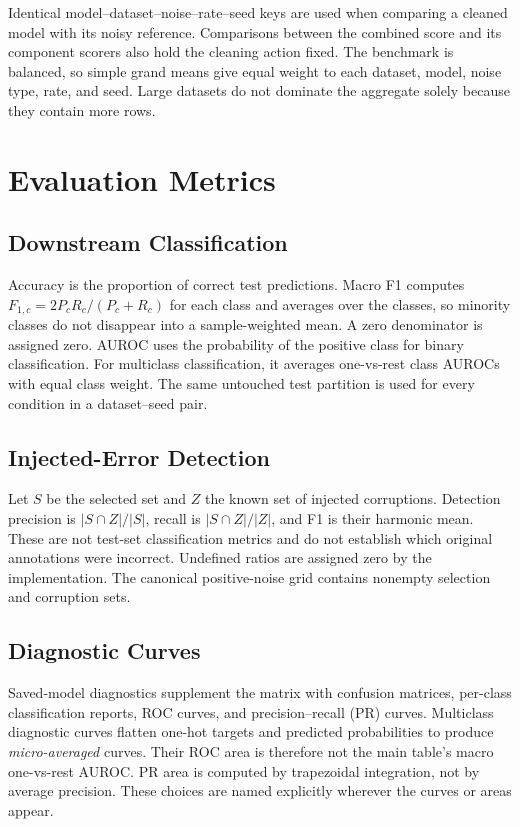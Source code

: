 Identical model--dataset--noise--rate--seed keys are used when comparing a
cleaned model with its noisy reference. Comparisons between the combined
score and its component scorers also hold the cleaning action fixed. The
benchmark is balanced, so simple grand means give equal weight to each
dataset, model, noise type, rate, and seed. Large datasets do not dominate
the aggregate solely because they contain more rows.

\section{Evaluation Metrics}
\subsection{Downstream Classification}
Accuracy is the proportion of correct test predictions. Macro F1 computes
$F_{1,c}=2P_cR_c/(P_c+R_c)$ for each class and averages over the classes,
so minority classes do not disappear into a sample-weighted mean. A zero
denominator is assigned zero. AUROC uses the probability of the positive
class for binary classification. For multiclass classification, it averages
one-vs-rest class AUROCs with equal class weight. The same untouched test
partition is used for every condition in a dataset--seed pair.

\subsection{Injected-Error Detection}
Let $S$ be the selected set and $Z$ the known set of injected corruptions.
Detection precision is $|S\cap Z|/|S|$, recall is $|S\cap Z|/|Z|$, and F1 is
their harmonic mean. These are not test-set classification metrics and do
not establish which original annotations were incorrect. Undefined ratios
are assigned zero by the implementation. The canonical positive-noise grid
contains nonempty selection and corruption sets.

\subsection{Diagnostic Curves}
Saved-model diagnostics supplement the matrix with confusion matrices,
per-class classification reports, ROC curves, and precision--recall (PR)
curves. Multiclass diagnostic curves flatten one-hot targets and predicted
probabilities to produce \emph{micro-averaged} curves. Their ROC area is
therefore not the main table's macro one-vs-rest AUROC. PR area is computed
by trapezoidal integration, not by average precision. These choices are
named explicitly wherever the curves or areas appear.

